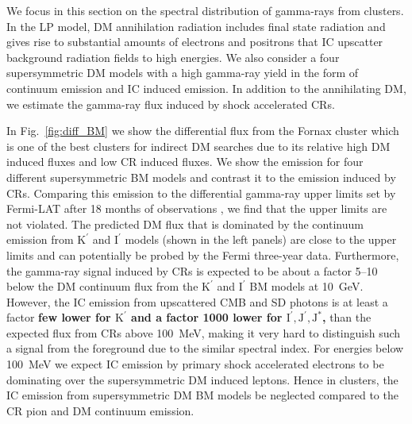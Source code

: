 \documentclass[10pt,aps,pra,reprint,amsmath,amsfonts,amssymb,showpacs,nofootinbib,floatfix]{revtex4-1}
\def\del#1{{}}
\def\C#1{{\bf #1}}
\newcommand{\rmn}{\mathrm}
\newcommand{\Kp}{\rmn{K}^\prime}
\newcommand{\Ip}{\rmn{I}^\prime}
\newcommand{\Js}{\rmn{J}^*}
\newcommand{\Jp}{\rmn{J}^\prime}
\begin{document}
We focus in this section on the spectral distribution of gamma-rays
from clusters. In the LP model, DM annihilation radiation includes
final state radiation and gives rise to substantial amounts of
electrons and positrons that IC upscatter background radiation fields
to high energies. We also consider a four supersymmetric DM models with
a high gamma-ray yield in the form of continuum emission and IC
induced emission. In addition to the annihilating DM, we estimate the
gamma-ray flux induced by shock accelerated CRs.

In Fig.~\ref{fig:diff_BM} we show the differential flux from the
Fornax cluster which is one of the best clusters for indirect DM
searches due to its relative high DM induced fluxes and low CR induced
fluxes. We show the emission for four different supersymmetric BM
models and contrast it to the emission induced by CRs. Comparing this
emission to the differential gamma-ray upper limits set by Fermi-LAT
after 18 months of observations \cite{2010ApJ...717L..71A}, we find
that the upper limits are not violated. The predicted DM flux that is
dominated by the continuum emission from $\Kp$ and $\Ip$ models (shown
in the left panels) are close to the upper limits and can potentially
be probed by the Fermi three-year data. Furthermore, the gamma-ray
signal induced by CRs is expected to be about a factor 5--10 below the
DM continuum flux from the $\Kp$ and $\Ip$ BM models at
10~GeV. However, the IC emission from upscattered CMB and SD photons
is at least a factor \C{few lower for $\Kp$ and a factor 1000 lower
  for $\Ip,\Jp,\Js$,} \del{10 lower} than the expected flux from CRs
above 100~MeV, making it very hard to distinguish such a signal from
the foreground due to the similar spectral index. For energies below
100~MeV we expect IC emission by primary shock accelerated electrons
to be dominating \cite{2010MNRAS.409..449P} over the supersymmetric DM
induced leptons. Hence in clusters, the IC emission from
supersymmetric DM BM models be neglected compared to the CR pion and
DM continuum emission.
\end{document}
